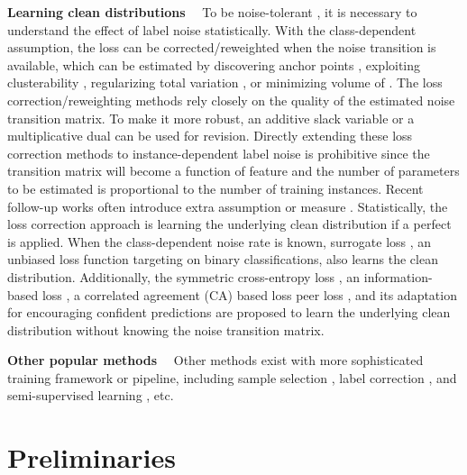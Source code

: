 \documentclass[final]{cvpr}
\begin{document}
\noindent\textbf{Learning clean distributions}~~
To be noise-tolerant \cite{manwani2013noise}, it is necessary to understand the effect of label noise statistically.
With the class-dependent assumption, the loss can be corrected/reweighted when the noise transition  is available, which can be estimated by discovering anchor points \cite{liu2015classification,patrini2017making,xia2020extended}, exploiting clusterability \cite{zhu2021clusterability}, regularizing total variation \cite{zhang2021learning}, or minimizing volume of  \cite{li2021provably}.
The loss correction/reweighting methods rely closely on the quality of the estimated noise transition matrix.
To make it more robust, an additive slack variable  \cite{xia2019anchor} or a multiplicative dual  \cite{dualT2020nips} can be used for revision.
Directly extending these loss correction methods to instance-dependent label noise is prohibitive since the transition matrix will become a function of feature  and the number of parameters to be estimated is proportional to the number of training instances. 
Recent follow-up works often introduce extra assumption \cite{xia2020parts} or measure  \cite{berthon2020confidence}.
Statistically, the loss correction approach is learning the underlying clean distribution if a perfect  is applied. 
When the class-dependent noise rate is known, surrogate loss \cite{natarajan2013learning}, an unbiased loss function targeting on binary classifications, also learns the clean distribution.
Additionally, the symmetric cross-entropy loss \cite{wang2019symmetric}, an information-based loss  \cite{xu2019l_dmi}, a correlated agreement (CA) based loss peer loss \cite{liu2019peer}, and its adaptation for encouraging confident predictions \cite{sieve2020} are proposed to learn the underlying clean distribution without knowing the noise transition matrix.



\noindent\textbf{Other popular methods}~~
Other methods exist with more sophisticated training framework or pipeline, including sample selection \cite{sieve2020,han2018co,jiang2017mentornet,lee2018cleannet,wei2020combating,yu2019does,yao2020searching}, label correction \cite{han2019deep,li2017learning,veit2017learning}, and semi-supervised learning \cite{Li2020DivideMix,nguyen2019self}, etc.





 \section{Preliminaries}\label{Sec:pre}
\end{document}
